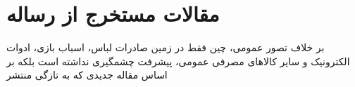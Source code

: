 \chapter{مقالات مستخرج از رساله}
بر خلاف تصور عمومی، چین فقط در زمین صادرات لباس، اسباب بازی، ادوات الکترونیک و سایر کالاهای مصرفی عمومی، پیشرفت چشمگیری نداشته است بلکه بر اساس مقاله جدیدی که به تازگی منتشر 